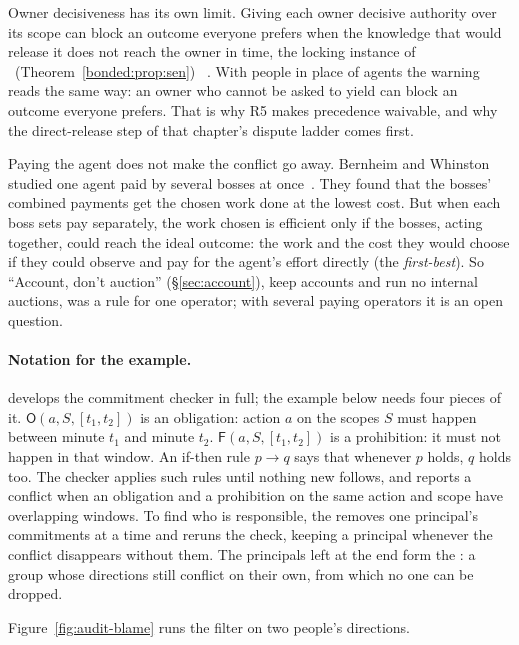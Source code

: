 Owner decisiveness has its own limit. Giving each owner decisive authority
over its scope can block an outcome everyone prefers when the knowledge that
would release it does not reach the owner in time, the locking instance of
%
\ifpdbook
\ (Theorem~\ref{bonded:prop:sen})%
\fi
~. With people in place of agents the warning
reads the same way: an owner who cannot be asked to yield can block an outcome
everyone prefers. That is why R5 makes precedence waivable, and why the
direct-release step of that chapter's dispute ladder comes first.

Paying the agent does not make the conflict go away. Bernheim and Whinston
studied one agent paid by several bosses at once~.
They found that the bosses' combined payments get the chosen work done at the
lowest cost. But when each boss sets pay separately, the work chosen is
efficient only if the bosses, acting together, could reach the ideal outcome:
the work and the cost they would choose if they could observe and pay for the
agent's effort directly (the \emph{first-best}). So ``Account, don't auction''
(\S\ref{sec:account}), keep accounts and run no internal auctions, was a rule
for one operator; with several paying operators it is an open question.

\paragraph{Notation for the example.} 
develops the commitment checker in full; the example below needs four pieces
of it. $\mathsf O(a,S,[t_1,t_2])$ is an obligation: action $a$ on the scopes
$S$ must happen between minute $t_1$ and minute $t_2$.
$\mathsf F(a,S,[t_1,t_2])$ is a prohibition: it must not happen in that
window. An if-then rule $p\to q$ says that whenever $p$ holds, $q$ holds too. The
checker applies such rules until nothing new follows, and reports a conflict
when an obligation and a prohibition on the same action and scope have
overlapping windows. To find who is responsible, the 
removes one principal's commitments at a time and reruns the check, keeping a
principal whenever the conflict disappears without them. The principals left
at the end form the : a group whose directions still conflict
on their own, from which no one can be dropped.

Figure~\ref{fig:audit-blame} runs the filter on two people's directions.

